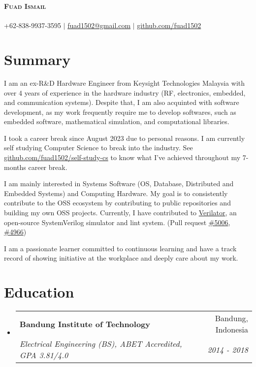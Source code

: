 \documentclass[letterpaper,11pt]{article}
\makeatletter
\newcommand{\resumeSubheading}[4]{
  \vspace{-2pt}\item
    \begin{tabular*}{0.97\textwidth}[t]{l@{\extracolsep{\fill}}r}
      \textbf{#1} & #2 \\
      \textit{\small#3} & \textit{\small #4} \\
    \end{tabular*}\vspace{-7pt}
}
\newcommand{\resumeSubHeadingListStart}{\begin{itemize}[leftmargin=0.15in, label={}]}
\newcommand{\resumeSubHeadingListEnd}{\end{itemize}}
\makeatother
\begin{document}
\begin{center}
  \textbf{\Huge \scshape Fuad Ismail} \\ \vspace{1pt}
  \small \textit{} \\
  +62-838-9937-3595 $|$ \href{mailto:fuad1502@gmail.com}{fuad1502@gmail.com} $|$ 
  \href{https://github.com/fuad1502}{github.com/fuad1502}
\end{center}

\section*{Summary}
\justifying
I am an ex-R\&D Hardware Engineer from Keysight Technologies Malaysia with over
4 years of experience in the hardware industry (RF, electronics, embedded, and
communication systems). Despite that, I am also acquinted with software
development, as my work frequently require me to develop softwares, such as
embedded software, mathematical simulation, and computational libraries.

I took a career break since August 2023 due to personal reasons. I am currently
self studying Computer Science to break into the industry. See
\href{https://github.com/fuad1502/self-study-cs}{github.com/fuad1502/self-study-cs}
to know what I've achieved throughout my 7-months career break.

I am mainly interested in Systems Software (OS, Database, Distributed and
Embedded Systems) and Computing Hardware. My goal is to consistently contribute
to the OSS ecosystem by contributing to public repositories and building my own
OSS projects. Currently, I have contributed to
\href{https://github.com/verilator/verilator}{Verilator}, an open-source
SystemVerilog simulator and lint system. (Pull request
\href{https://github.com/verilator/verilator/pull/5006}{\#5006},
\href{https://github.com/verilator/verilator/pull/4966}{\#4966})

I am a passionate learner committed to continuous learning and have a track
record of showing initiative at the workplace and deeply care about my work.

\section{Education}
\resumeSubHeadingListStart
\resumeSubheading
  {Bandung Institute of Technology}{Bandung, Indonesia}
  {Electrical Engineering (BS), ABET Accredited, GPA
  3.81/4.0}{2014 - 2018}
\resumeSubHeadingListEnd
\end{document}
